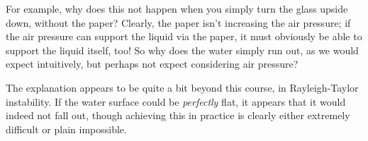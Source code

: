 For example, why does this not happen when you simply turn the glass upside down, without the paper? Clearly, the paper isn't increasing the air pressure; if the air pressure can support the liquid via the paper, it must obviously be able to support the liquid itself, too! So why does the water simply run out, as we would expect intuitively, but perhaps not expect considering air pressure?

The explanation appears to be quite a bit beyond this course, in Rayleigh-Taylor instability. If the water surface could be \emph{perfectly} flat, it appears that it would indeed not fall out, though achieving this in practice is clearly either extremely difficult or plain impossible.


